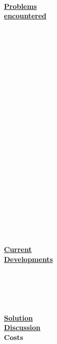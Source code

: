 \begin{parcolumns}[colwidths={1=2.5 cm, 2=10 cm, 3=2.5cm}]{3}
{			\\\\\\\\\\\\ \\ \\\\ \\ \\ \underline{\textbf{Problems}}\\ \underline{\textbf{encountered}} \\ \\ \\ \\ \\ \\ \\ \\ \\ \\ \\ \\ \\\\ \\\ \\ \\ \\ \ \\ \\ \\ \\ \\ \\ \underline{\textbf{Current}}\\ \underline{\textbf{Developments}}\\\\ \\ \\ \\ \\  \underline{\textbf{Solution}}\\ \underline{\textbf{Discussion}}\\ \textbf{Costs}
}
\end{parcolumns}
